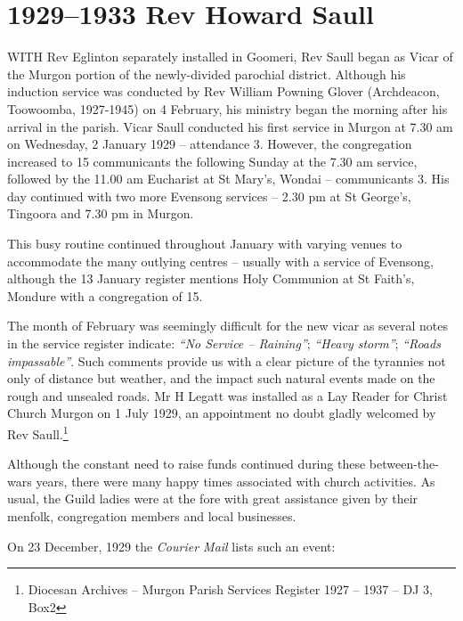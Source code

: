 

\chapter{1929--1933 Rev Howard Saull}
\nobalance


\lettrine[lines=3]{W}{ITH}
 Rev Eglinton separately installed in Goomeri, Rev Saull began as Vicar of the Murgon portion of the newly-divided parochial district. Although his induction service was conducted by Rev William Powning Glover (Archdeacon, Toowoomba, 1927-1945) on 4 February, his ministry began the morning after his arrival in the parish. Vicar Saull conducted his first service in Murgon at 7.30 am on Wednesday, 2 January 1929 -- attendance 3. However, the congregation increased to 15 communicants the following Sunday at the 7.30 am service, followed by the 11.00 am Eucharist at St Mary's, Wondai -- communicants 3. His day continued with two more Evensong services -- 2.30 pm at St George's, Tingoora and 7.30 pm in Murgon.

This busy routine continued throughout January with varying venues to accommodate the many outlying centres -- usually with a service of Evensong, although the 13 January register mentions Holy Communion at St Faith's, Mondure with a congregation of 15.



The month of February was seemingly difficult for the new vicar as several notes in the service register indicate: \emph{``No Service -- Raining''}; \emph{``Heavy storm''}; \emph{``Roads impassable''}. Such comments provide us with a clear picture of the tyrannies not only of distance but weather, and the impact such natural events made on the rough and unsealed roads. Mr H Legatt was installed as a Lay Reader for Christ Church Murgon on 1 July 1929, an appointment no doubt gladly welcomed by Rev Saull.\footnote{Diocesan Archives -- Murgon Parish Services Register 1927 -- 1937 -- DJ 3, Box2}


Although the constant need to raise funds continued during these between-the-wars years, there were many happy times associated with church activities. As usual, the Guild ladies were at the fore with great assistance given by their menfolk, congregation members and local businesses.



On 23 December, 1929 the \emph{Courier Mail} lists such an event:




